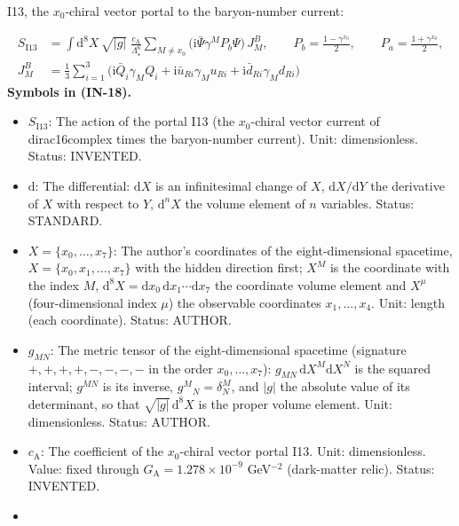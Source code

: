 \documentclass[
  10pt,
]{article}
\providecommand{\tightlist}{%
  \setlength{\itemsep}{0pt}\setlength{\parskip}{0pt}}
\begin{document}
I13, the \(x_0\)-chiral vector portal to the baryon-number current:

\[
\begin{aligned}
S_{\mathrm{I13}} &= \int\mathrm{d}^8X\,\sqrt{\lvert g\rvert}\;\frac{c_{\mathrm{A}}}{\Lambda_\star^6}
 \sum_{M\ne x_0}\big(\mathrm{i}\bar\Psi\gamma^MP_b\Psi\big)\,J^{B}_M,\qquad P_b = \frac{1 - \gamma^{x_0}}{2},
 \qquad P_a = \frac{1 + \gamma^{x_0}}{2},\\
J^{B}_M &= \frac13\sum_{i=1}^{3}\big(\mathrm{i}\bar Q_i\gamma_MQ_i + \mathrm{i}\bar u_{Ri}\gamma_Mu_{Ri}
 + \mathrm{i}\bar d_{Ri}\gamma_Md_{Ri}\big)
\end{aligned} \tag{IN-18}
\] \textbf{Symbols in (IN-18).}

\begin{itemize}
\tightlist
\item
  \(S_{\mathrm{I13}}\): The action of the portal I13 (the \(x_0\)-chiral
  vector current of dirac16complex times the baryon-number current).
  Unit: dimensionless. Status: INVENTED.
\item
  \(\mathrm{d}\): The differential: \(\mathrm{d}X\) is an infinitesimal
  change of \(X\), \(\mathrm{d}X/\mathrm{d}Y\) the derivative of \(X\)
  with respect to \(Y\), \(\mathrm{d}^nX\) the volume element of \(n\)
  variables. Status: STANDARD.
\item
  \(X = \{x_0, \dots, x_7\}\): The author's coordinates of the
  eight-dimensional spacetime, \(X = \{x_0, x_1, \dots, x_7\}\) with the
  hidden direction first; \(X^M\) is the coordinate with the index
  \(M\),
  \(\mathrm{d}^8X = \mathrm{d}x_0\,\mathrm{d}x_1\cdots\mathrm{d}x_7\)
  the coordinate volume element and \(X^\mu\) (four-dimensional index
  \(\mu\)) the observable coordinates \(x_1, \dots, x_4\). Unit: length
  (each coordinate). Status: AUTHOR.
\item
  \(g_{MN}\): The metric tensor of the eight-dimensional spacetime
  (signature \(+,+,+,+,-,-,-,-\) in the order \(x_0, \dots, x_7\)):
  \(g_{MN}\,\mathrm{d}X^M\mathrm{d}X^N\) is the squared interval;
  \(g^{MN}\) is its inverse, \(g^M{}_N = \delta^M_N\), and
  \(\lvert g\rvert\) the absolute value of its determinant, so that
  \(\sqrt{\lvert g\rvert}\,\mathrm{d}^8X\) is the proper volume element.
  Unit: dimensionless. Status: AUTHOR.
\item
  \(c_{\mathrm{A}}\): The coefficient of the \(x_0\)-chiral vector
  portal I13. Unit: dimensionless. Value: fixed through
  \(G_{\mathrm{A}} = 1.278\times10^{-9}\) GeV\(^{-2}\) (dark-matter
  relic). Status: INVENTED.
\item

\end{itemize}
\end{document}
